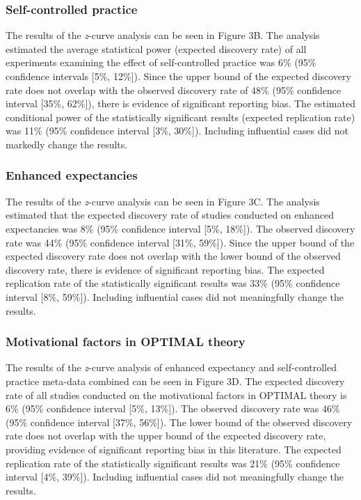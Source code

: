 \documentclass[
  man, donotrepeattitle,mask,floatsintext]{apa7}
\begin{document}
\hypertarget{self-controlled-practice-1}{%
\subsubsection{Self-controlled practice}\label{self-controlled-practice-1}}

The results of the \emph{z}-curve analysis can be seen in Figure 3B. The analysis estimated the average statistical power (expected discovery rate) of all experiments examining the effect of self-controlled practice was 6\% (95\% confidence intervals {[}5\%, 12\%{]}). Since the upper bound of the expected discovery rate does not overlap with the observed discovery rate of 48\% (95\% confidence interval {[}35\%, 62\%{]}), there is evidence of significant reporting bias. The estimated conditional power of the statistically significant results (expected replication rate) was 11\% (95\% confidence interval {[}3\%, 30\%{]}). Including influential cases did not markedly change the results.

\hypertarget{enhanced-expectancies-1}{%
\subsubsection{Enhanced expectancies}\label{enhanced-expectancies-1}}

The results of the \emph{z}-curve analysis can be seen in Figure 3C. The analysis estimated that the expected discovery rate of studies conducted on enhanced expectancies was 8\% (95\% confidence interval {[}5\%, 18\%{]}). The observed discovery rate was 44\% (95\% confidence interval {[}31\%, 59\%{]}). Since the upper bound of the expected discovery rate does not overlap with the lower bound of the observed discovery rate, there is evidence of significant reporting bias. The expected replication rate of the statistically significant results was 33\% (95\% confidence interval {[}8\%, 59\%{]}). Including influential cases did not meaningfully change the results.

\hypertarget{motivational-factors-in-optimal-theory}{%
\subsubsection{Motivational factors in OPTIMAL theory}\label{motivational-factors-in-optimal-theory}}

The results of the \emph{z}-curve analysis of enhanced expectancy and self-controlled practice meta-data combined can be seen in Figure 3D. The expected discovery rate of all studies conducted on the motivational factors in OPTIMAL theory is 6\% (95\% confidence interval {[}5\%, 13\%{]}). The observed discovery rate was 46\% (95\% confidence interval {[}37\%, 56\%{]}). The lower bound of the observed discovery rate does not overlap with the upper bound of the expected discovery rate, providing evidence of significant reporting bias in this literature. The expected replication rate of the statistically significant results was 21\% (95\% confidence interval {[}4\%, 39\%{]}). Including influential cases did not meaningfully change the results.
\end{document}
